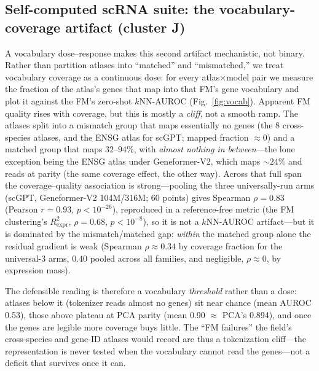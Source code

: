 \documentclass[11pt]{article}
\begin{document}
\subsection{Self-computed scRNA suite: the vocabulary-coverage artifact (cluster J)}
A vocabulary dose--response makes this second artifact mechanistic, not binary. Rather than partition atlases into ``matched'' and ``mismatched,'' we treat vocabulary coverage as a continuous dose: for every atlas$\times$model pair we measure the fraction of the atlas's genes that map into that FM's gene vocabulary and plot it against the FM's zero-shot $k$NN-AUROC (Fig.~\ref{fig:vocab}). Apparent FM quality rises with coverage, but this is mostly a \emph{cliff}, not a smooth ramp. The atlases split into a mismatch group that maps essentially no genes (the 8 cross-species atlases, and the ENSG atlas for scGPT; mapped fraction $\approx 0$) and a matched group that maps $32$--$94\%$, with \emph{almost nothing in between}---the lone exception being the ENSG atlas under Geneformer-V2, which maps ${\sim}24\%$ and reads at parity (the same coverage effect, the other way). Across that full span the coverage--quality association is strong---pooling the three universally-run arms (scGPT, Geneformer-V2 104M/316M; 60 points) gives Spearman $\rho=0.83$ (Pearson $r=0.93$, $p<10^{-26}$), reproduced in a reference-free metric (the FM clustering's $R^2_{\mathrm{expr}}$, $\rho=0.68$, $p<10^{-8}$), so it is not a $k$NN-AUROC artifact---but it is dominated by the mismatch/matched gap: \emph{within} the matched group alone the residual gradient is weak (Spearman $\rho\approx0.34$ by coverage fraction for the universal-3 arms, $0.40$ pooled across all families, and negligible, $\rho\!\approx\!0$, by expression mass).

The defensible reading is therefore a vocabulary \emph{threshold} rather than a dose: atlases below it (tokenizer reads almost no genes) sit near chance (mean AUROC 0.53), those above plateau at PCA parity (mean 0.90 $\approx$ PCA's 0.894), and once the genes are legible more coverage buys little. The ``FM failures'' the field's cross-species and gene-ID atlases would record are thus a tokenization cliff---the representation is never tested when the vocabulary cannot read the genes---not a deficit that survives once it can.
\end{document}
